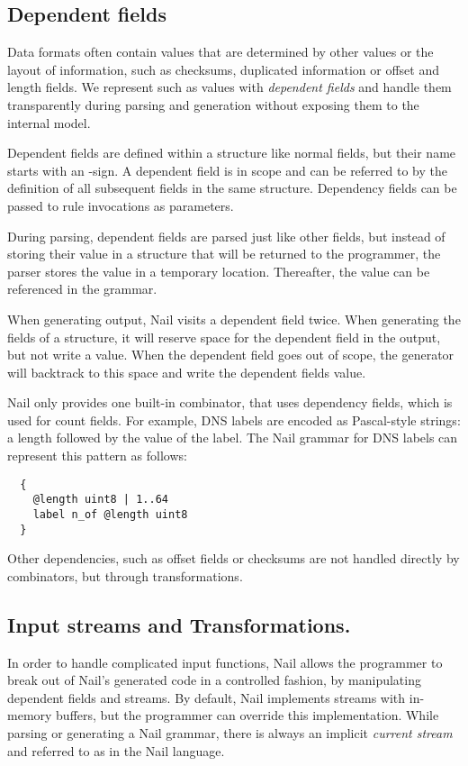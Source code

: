 \subsection{Dependent fields}
\label{s:dependent}
Data formats often contain values that are determined by other values or the layout of information,
such as checksums, duplicated information  or offset and  length fields.
We represent such as values with \emph{dependent fields} and handle them transparently during
parsing and generation without exposing them to the internal model. 


Dependent fields are defined within a structure like normal fields, but their name starts with an \@-sign. 
A dependent field is in scope and can be referred to by the definition of all subsequent fields in
the same structure. Dependency fields can be passed to rule invocations as parameters.

During parsing, dependent fields are parsed just like other fields, but instead of storing their
value in a structure that will be returned to the programmer, the parser stores the value in a
temporary location. Thereafter, the value can be referenced in the grammar. 

When generating output, Nail visits a dependent field twice. When generating the fields of a
structure, it will reserve space for the dependent field in the output, but not write a value. When
the dependent field goes out of scope, the generator will backtrack to this space and write the
dependent fields value.

Nail only provides one built-in combinator,  that uses dependency fields, which is used
for count fields. For example, DNS labels are encoded as Pascal-style strings: a length followed by
the value of the label. The Nail grammar for DNS labels can represent
this pattern as follows:

{
\smaller[0.5]
\begin{verbatim}
  {
    @length uint8 | 1..64
    label n_of @length uint8
  }
\end{verbatim}
}

Other dependencies, such as offset fields or checksums are not handled directly by combinators, but
through  transformations.

\subsection{Input streams and Transformations.}
\label{s:transforms}
In order to handle complicated input functions, Nail allows the programmer to
break out of Nail's generated code in a controlled fashion, by manipulating dependent fields and
streams. 
By default, Nail implements streams with in-memory buffers, but the programmer can override this implementation.
While parsing or generating a Nail grammar, there is always an implicit \emph{current stream} and
referred to as  in the Nail language.

